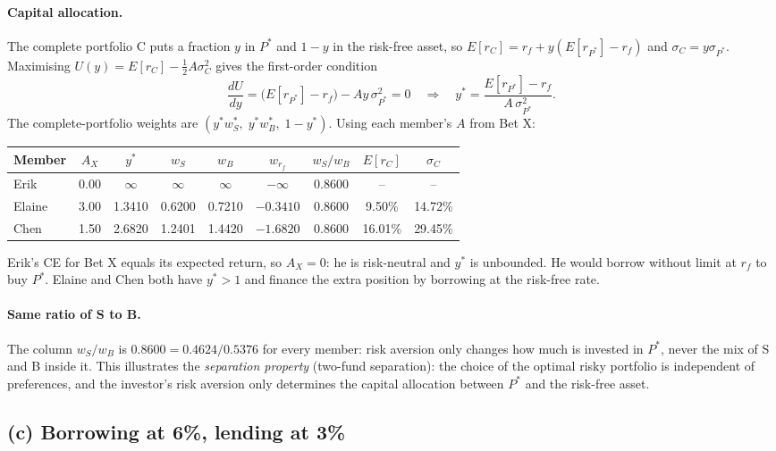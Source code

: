 \documentclass[11pt]{article}
\begin{document}
\paragraph{Capital allocation.}
The complete portfolio C puts a fraction $y$ in $P^*$ and $1-y$ in the risk-free asset, so $E[r_C] = r_f + y(E[r_{P^*}] - r_f)$ and $\sigma_C = y\sigma_{P^*}$. Maximising $U(y) = E[r_C] - \tfrac12 A\sigma_C^2$ gives the first-order condition
\[
\frac{dU}{dy} = \bigl(E[r_{P^*}] - r_f\bigr) - A y\,\sigma_{P^*}^2 = 0
\quad\Longrightarrow\quad
y^* = \frac{E[r_{P^*}] - r_f}{A\,\sigma_{P^*}^2}.
\]
The complete-portfolio weights are $(y^* w_S^*,\; y^* w_B^*,\; 1 - y^*)$. Using each member's $A$ from Bet X:

\begin{center}
\begin{tabular}{lcccccccc}
\toprule
Member & $A_X$ & $y^*$ & $w_S$ & $w_B$ & $w_{r_f}$ & $w_S/w_B$ & $E[r_C]$ & $\sigma_C$ \\
\midrule
Erik   & 0.00 & $\infty$ & $\infty$ & $\infty$ & $-\infty$ & 0.8600 & -- & -- \\
Elaine & 3.00 & 1.3410 & 0.6200 & 0.7210 & $-0.3410$ & 0.8600 & 9.50\% & 14.72\% \\
Chen   & 1.50 & 2.6820 & 1.2401 & 1.4420 & $-1.6820$ & 0.8600 & 16.01\% & 29.45\% \\
\bottomrule
\end{tabular}
\end{center}

Erik's CE for Bet X equals its expected return, so $A_X = 0$: he is risk-neutral and $y^*$ is unbounded. He would borrow without limit at $r_f$ to buy $P^*$. Elaine and Chen both have $y^* > 1$ and finance the extra position by borrowing at the risk-free rate.

\paragraph{Same ratio of S to B.}
The column $w_S/w_B$ is $0.8600 = 0.4624/0.5376$ for every member: risk aversion only changes how much is invested in $P^*$, never the mix of S and B inside it. This illustrates the \emph{separation property} (two-fund separation): the choice of the optimal risky portfolio is independent of preferences, and the investor's risk aversion only determines the capital allocation between $P^*$ and the risk-free asset.

\subsection*{(c) Borrowing at 6\%, lending at 3\%}
\end{document}
